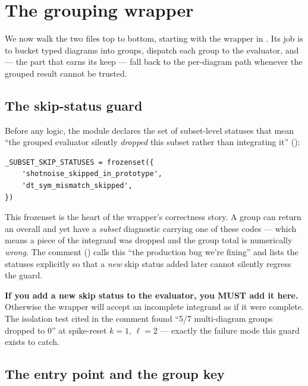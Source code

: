 \section{The grouping wrapper}

We now walk the two files top to bottom, starting with the wrapper in
. Its job is to bucket typed diagrams into
groups, dispatch each group to the evaluator, and --- the part that earns its
keep --- fall back to the per-diagram path whenever the grouped result cannot be
trusted.

\subsection{The skip-status guard}

Before any logic, the module declares the set of subset-level statuses that mean
``the grouped evaluator silently \emph{dropped} this subset rather than
integrating it'' ():
\begin{lstlisting}
_SUBSET_SKIP_STATUSES = frozenset({
    'shotnoise_skipped_in_prototype',
    'dt_sym_mismatch_skipped',
})
\end{lstlisting}
This frozenset is the heart of the wrapper's correctness story. A group can return
an overall  and yet have a \emph{subset} diagnostic carrying one
of these codes --- which means a piece of the integrand was dropped and the group
total is numerically \emph{wrong}. The comment ()
calls this ``the production bug we're fixing'' and lists the statuses explicitly
so that a \emph{new} skip status added later cannot silently regress the guard.

\begin{gotcha}
\textbf{If you add a new skip status to the evaluator, you MUST add it here.}
Otherwise the wrapper will accept an incomplete integrand as if it were
complete. The isolation test cited in the comment found
``5/7 multi-diagram groups dropped to 0'' at spike-reset $k=1$, $\ell=2$ ---
exactly the failure mode this guard exists to catch.
\end{gotcha}

\subsection{The entry point and the group key}

